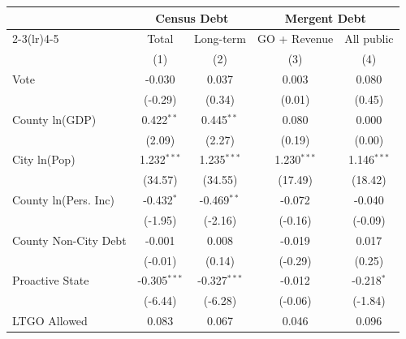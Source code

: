 \begingroup
\centering
\begin{tabular*}{\textwidth}{@{\extracolsep{\fill}}lcccc}
   \toprule
                               & \multicolumn{2}{c}{Census Debt} & \multicolumn{2}{c}{Mergent Debt}\\  
   \cmidrule(lr){2-3}\cmidrule(lr){4-5}
                               & Total             & Long-term             & GO + Revenue              & All public \\   
                               & (1)               & (2)                   & (3)                       & (4)\\  
   \midrule 
   Vote                        & -0.030            & 0.037                 & 0.003                     & 0.080\\   
                               & (-0.29)          & (0.34)               & (0.01)                   & (0.45)\\   
   County ln(GDP)              & 0.422$^{**}$      & 0.445$^{**}$          & 0.080                     & 0.000\\   
                               & (2.09)           & (2.27)               & (0.19)                   & (0.00)\\   
   City ln(Pop)                & 1.232$^{***}$     & 1.235$^{***}$         & 1.230$^{***}$             & 1.146$^{***}$\\   
                               & (34.57)          & (34.55)              & (17.49)                  & (18.42)\\   
   County ln(Pers. Inc)        & -0.432$^{*}$      & -0.469$^{**}$         & -0.072                    & -0.040\\   
                               & (-1.95)          & (-2.16)              & (-0.16)                  & (-0.09)\\   
   County Non-City Debt        & -0.001            & 0.008                 & -0.019                    & 0.017\\   
                               & (-0.01)          & (0.14)               & (-0.29)                  & (0.25)\\   
   Proactive State             & -0.305$^{***}$    & -0.327$^{***}$        & -0.012                    & -0.218$^{*}$\\   
                               & (-6.44)          & (-6.28)              & (-0.06)                  & (-1.84)\\   
   LTGO Allowed                & 0.083             & 0.067                 & 0.046                     & 0.096\\   

\end{tabular*}
